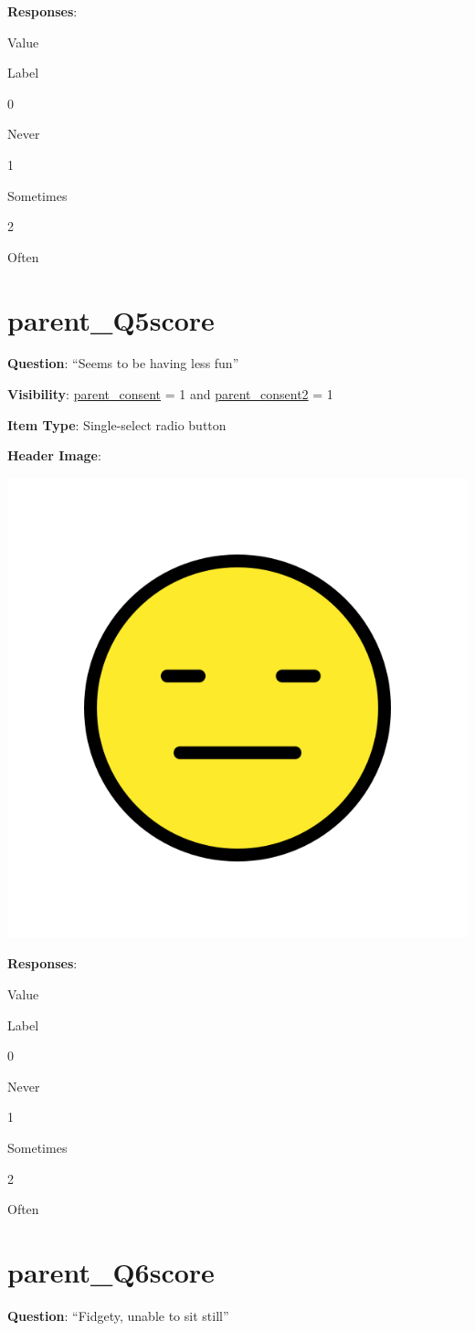 \documentclass[]{book}
\begin{document}
\textbf{Responses}:

Value

Label

0

Never

1

Sometimes

2

Often

\hypertarget{parent_q5score}{%
\section{parent\_Q5score}\label{parent_q5score}}

\textbf{Question}: ``Seems to be having less fun''

\textbf{Visibility}: \protect\hyperlink{parent_consent}{parent\_consent} = 1 and \protect\hyperlink{parent_consent2}{parent\_consent2} = 1

\textbf{Item Type}: Single-select radio button

\textbf{Header Image}:

\begin{flushleft}\includegraphics[width=0.33\linewidth]{downloadFigs4latex_HBN_PMHS_Codebook/parent_Q5score_headerImg} \end{flushleft}

\textbf{Responses}:

Value

Label

0

Never

1

Sometimes

2

Often

\hypertarget{parent_q6score}{%
\section{parent\_Q6score}\label{parent_q6score}}

\textbf{Question}: ``Fidgety, unable to sit still''
\end{document}
